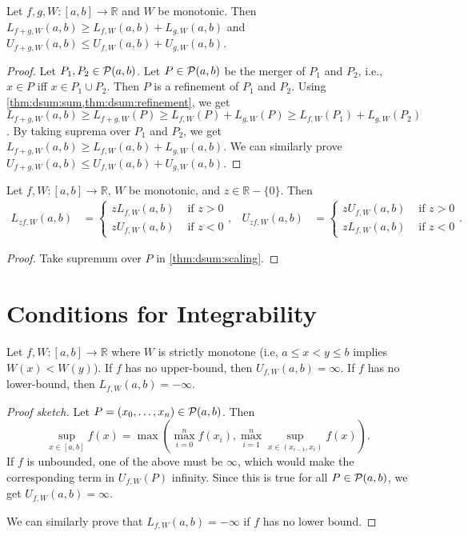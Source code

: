 \documentclass[a4paper,12pt,fleqn]{article}
\begin{document}
\begin{lemma}
\label{thm:dint:sum}
Let $f, g, W: [a, b] \to \mathbb{R}$ and $W$ be monotonic.
Then $L_{f+g,W}(a, b) \ge L_{f,W}(a, b) + L_{g,W}(a, b)$
and $U_{f+g,W}(a, b) \le U_{f,W}(a, b) + U_{g,W}(a, b)$.
\end{lemma}
\begin{proof}
Let $P_1, P_2 \in \mathcal{P}(a, b)$.
Let $P \in \mathcal{P}(a, b)$ be the merger of $P_1$ and $P_2$,
i.e., $x \in P$ iff $x \in P_1 \cup P_2$.
Then $P$ is a refinement of $P_1$ and $P_2$.
Using \cref{thm:dsum:sum,thm:dsum:refinement}, we get
$L_{f+g,W}(a, b) \ge L_{f+g,W}(P) \ge L_{f,W}(P) + L_{g,W}(P) \ge L_{f,W}(P_1) + L_{g,W}(P_2)$.
By taking suprema over $P_1$ and $P_2$, we get
$L_{f+g,W}(a, b) \ge L_{f,W}(a, b) + L_{g,W}(a, b)$.
We can similarly prove $U_{f+g,W}(a, b) \le U_{f,W}(a, b) + U_{g,W}(a, b)$.
\end{proof}

\begin{lemma}
\label{thm:dint:scaling}
Let $f, W: [a, b] \to \mathbb{R}$, $W$ be monotonic, and $z \in \mathbb{R} - \{0\}$. Then
\begin{align*}
L_{zf,W}(a, b) &= \begin{cases}
    zL_{f,W}(a, b) & \text{ if } z > 0
    \\ zU_{f,W}(a, b) & \text{ if } z < 0
\end{cases},
& U_{zf,W}(a, b) &= \begin{cases}
    zU_{f,W}(a, b) & \text{ if } z > 0
    \\ zL_{f,W}(a, b) & \text{ if } z < 0
\end{cases}.
\end{align*}
\end{lemma}
\begin{proof}
Take supremum over $P$ in \cref{thm:dsum:scaling}.
\end{proof}

\section{Conditions for Integrability}

\begin{lemma}
\label{thm:dint:unbounded}
Let $f, W: [a, b] \to \mathbb{R}$ where $W$ is strictly monotone
(i.e, $a \le x < y \le b$ implies $W(x) < W(y)$).
If $f$ has no upper-bound, then $U_{f,W}(a, b) = \infty$.
If $f$ has no lower-bound, then $L_{f,W}(a, b) = -\infty$.
\end{lemma}
\begin{proof}[Proof sketch]
Let $P = (x_0, \ldots, x_n) \in \mathcal{P}(a, b)$. Then
\[ \sup_{x \in [a, b]} f(x) = \max\left(\max_{i=0}^n f(x_i),
    \max_{i=1}^n\sup_{x \in (x_{i-1}, x_i)} f(x)\right). \]
If $f$ is unbounded, one of the above must be $\infty$,
which would make the corresponding term in $U_{f,W}(P)$ infinity.
Since this is true for all $P \in \mathcal{P}(a, b)$, we get $U_{f,W}(a, b) = \infty$.

We can similarly prove that $L_{f,W}(a, b) = -\infty$ if $f$ has no lower bound.
\end{proof}
\end{document}
